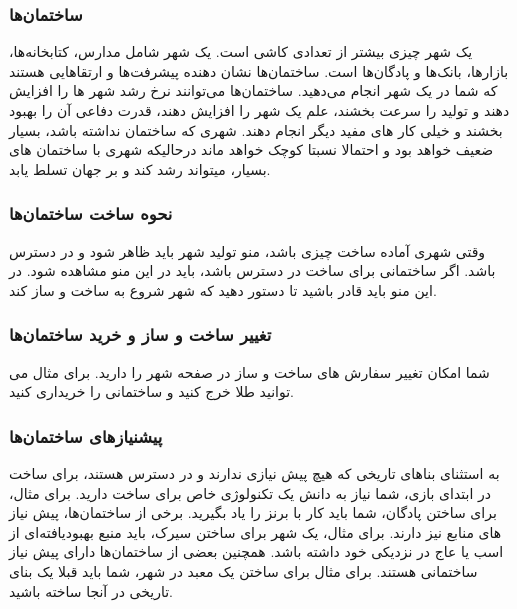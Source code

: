 \documentclass[]{article}
\begin{document}
\subsubsection*{{\titr ساختمان‌ها}}
یک شهر چیزی بیشتر از تعدادی کاشی است. یک شهر شامل مدارس، کتابخانه‌ها، بازارها، بانک‌ها و پادگان‌ها است. ساختمان‌ها نشان دهنده پیشرفت‌ها و ارتقا‌هایی هستند که شما در یک شهر انجام می‌دهید. 
ساختمان‌ها می‌توانند نرخ رشد شهر ها را افزایش دهند و تولید را سرعت بخشند، علم یک شهر را افزایش دهند، قدرت دفاعی آن را بهبود بخشند و خیلی کار های مفید دیگر انجام دهند.
شهری که ساختمان نداشته باشد‌، بسیار ضعیف خواهد بود و احتمالا نسبتا کوچک خواهد ماند درحالیکه شهری با ساختمان های بسیار، میتواند رشد کند و بر جهان تسلط یابد.


\subsubsection*{{\titr نحوه ساخت ساختمان‌ها}}
وقتی شهری آماده ساخت چیزی باشد، منو تولید شهر باید ظاهر شود و در دسترس باشد. اگر ساختمانی برای ساخت در دسترس باشد، باید در این منو مشاهده شود. در این منو باید قادر باشید تا دستور دهید که شهر شروع به ساخت و ساز کند.


\subsubsection*{{\titr تغییر ساخت و ساز و خرید ساختمان‌ها}}
شما امکان تغییر سفارش های ساخت و ساز در صفحه شهر را دارید. برای مثال می توانید طلا خرج کنید و ساختمانی را خریداری کنید.


\subsubsection*{{\titr پیشنیاز‌های ساختمان‌ها}}
به استثنای بناهای تاریخی که هیچ پیش نیازی ندارند و در دسترس هستند، برای ساخت در ابتدای بازی، شما نیاز به دانش یک تکنولوژی خاص برای ساخت دارید. برای مثال، برای ساختن پادگان، شما باید کار با برنز را یاد بگیرید.
برخی از ساختمان‌ها، پیش نیاز های منابع نیز دارند. برای مثال، یک شهر برای ساختن سیرک، باید منبع بهبودیافته‌ای از اسب یا عاج در نزدیکی خود داشته باشد.
همچنین بعضی از ساختمان‌ها دارای پیش نیاز ساختمانی هستند. برای مثال برای ساختن یک معبد در شهر، شما باید قبلا یک بنای تاریخی در آنجا ساخته باشید.
\end{document}
